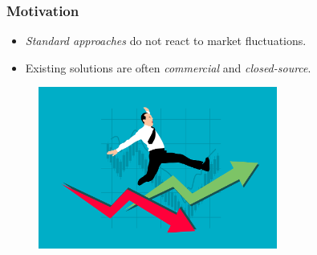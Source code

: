 





\begin{frame}
  \frametitle{Motivation}

  \centering

  \begin{itemize}
    \item \emph{Standard approaches} do not react to market fluctuations.
    \item Existing solutions are often \emph{commercial} and \emph{closed-source}.
  \end{itemize}

  \smallskip

  \begin{figure}
      \includegraphics[width=0.7\textwidth]{img/risk.png}
  \end{figure}
\end{frame}


